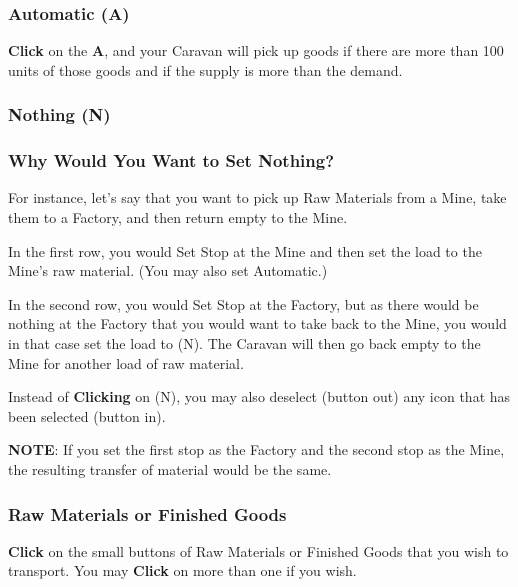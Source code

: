 \subsubsection{\textsf{Automatic (A)}}


\textbf{Click} on the \textbf{A}, and your Caravan will pick up goods if there are more than 100 units of those goods and if the supply is more than the demand.

\subsubsection{\textsf{Nothing (N)}}

\subsubsection{\textsf{Why Would You Want to Set Nothing?}}


For instance, let’s say that you want to pick up Raw Materials from a Mine, take them to a Factory, and then return empty to the Mine.


\begin{changemargin}{.5cm}{0cm}
In the first row, you would Set Stop at the Mine and then set the load to the Mine’s raw material. (You may also set Automatic.)

In the second row, you would Set Stop at the Factory, but as there would be nothing at the Factory that you would want to take back to the Mine, you would in that case set the load to (N). The Caravan will then go back empty to the Mine for another load of raw material.


Instead of \textbf{Clicking} on (N), you may also deselect (button out) any icon that has been selected (button in).
\end{changemargin}

\textbf{NOTE}: If you set the first stop as the Factory and the second stop as the Mine, the resulting transfer of material would be the same.

\subsubsection{\textsf{Raw Materials or Finished Goods}}

\textbf{Click} on the small buttons of Raw Materials or Finished Goods that you wish to transport. You may \textbf{Click} on more than one if you wish.

